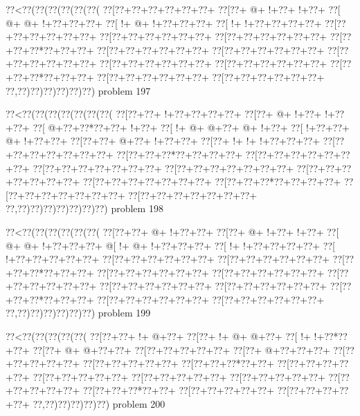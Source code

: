 \vbox{\vbox{\goo
\0??<\0??(\0??(\0??(\0??(\0??(\0??(
\0??[\0??+\0??+\0??+\0??+\0??+\0??+
\0??[\0??+\- @+\- !+\0??+\- !+\0??+
\0??[\- @+\- @+\- !+\0??+\0??+\0??+
\0??[\- !+\- @+\- !+\0??+\0??+\0??+
\0??[\- !+\- !+\0??+\0??+\0??+\0??+
\0??[\0??+\0??+\0??+\0??+\0??+\0??+
\0??[\0??+\0??+\0??+\0??+\0??+\0??+
\0??[\0??+\0??+\0??+\0??+\0??+\0??+
\0??[\0??+\0??+\0??*\0??+\0??+\0??+
\0??[\0??+\0??+\0??+\0??+\0??+\0??+
\0??[\0??+\0??+\0??+\0??+\0??+\0??+
\0??[\0??+\0??+\0??+\0??+\0??+\0??+
\0??[\0??+\0??+\0??+\0??+\0??+\0??+
\0??[\0??+\0??+\0??+\0??+\0??+\0??+
\0??[\0??+\0??+\0??*\0??+\0??+\0??+
\0??[\0??+\0??+\0??+\0??+\0??+\0??+
\0??[\0??+\0??+\0??+\0??+\0??+\0??+
\0??,\0??)\0??)\0??)\0??)\0??)\0??)
}
\hfil problem 197\hfil\break
}

\vbox{\vbox{\goo
\0??<\0??(\0??(\0??(\0??(\0??(\0??(\0??(
\0??[\0??+\0??+\- !+\0??+\0??+\0??+\0??+
\0??[\0??+\- @+\- !+\0??+\- !+\0??+\0??+
\0??[\- @+\0??+\0??*\0??+\0??+\- !+\0??+
\0??[\- !+\- @+\- @+\0??+\- @+\- !+\0??+
\0??[\- !+\0??+\0??+\- @+\- !+\0??+\0??+
\0??[\0??+\0??+\- @+\0??+\- !+\0??+\0??+
\0??[\0??+\- !+\- !+\- !+\0??+\0??+\0??+
\0??[\0??+\0??+\0??+\0??+\0??+\0??+\0??+
\0??[\0??+\0??+\0??*\0??+\0??+\0??+\0??+
\0??[\0??+\0??+\0??+\0??+\0??+\0??+\0??+
\0??[\0??+\0??+\0??+\0??+\0??+\0??+\0??+
\0??[\0??+\0??+\0??+\0??+\0??+\0??+\0??+
\0??[\0??+\0??+\0??+\0??+\0??+\0??+\0??+
\0??[\0??+\0??+\0??+\0??+\0??+\0??+\0??+
\0??[\0??+\0??+\0??*\0??+\0??+\0??+\0??+
\0??[\0??+\0??+\0??+\0??+\0??+\0??+\0??+
\0??[\0??+\0??+\0??+\0??+\0??+\0??+\0??+
\0??,\0??)\0??)\0??)\0??)\0??)\0??)\0??)
}
\hfil problem 198\hfil\break
}

\vbox{\vbox{\goo
\0??<\0??(\0??(\0??(\0??(\0??(\0??(
\0??[\0??+\0??+\- @+\- !+\0??+\0??+
\0??[\0??+\- @+\- !+\0??+\- !+\0??+
\0??[\- @+\- @+\- !+\0??+\0??+\0??+
\- @[\- !+\- @+\- !+\0??+\0??+\0??+
\0??[\- !+\- !+\0??+\0??+\0??+\0??+
\0??[\- !+\0??+\0??+\0??+\0??+\0??+
\0??[\0??+\0??+\0??+\0??+\0??+\0??+
\0??[\0??+\0??+\0??+\0??+\0??+\0??+
\0??[\0??+\0??+\0??*\0??+\0??+\0??+
\0??[\0??+\0??+\0??+\0??+\0??+\0??+
\0??[\0??+\0??+\0??+\0??+\0??+\0??+
\0??[\0??+\0??+\0??+\0??+\0??+\0??+
\0??[\0??+\0??+\0??+\0??+\0??+\0??+
\0??[\0??+\0??+\0??+\0??+\0??+\0??+
\0??[\0??+\0??+\0??*\0??+\0??+\0??+
\0??[\0??+\0??+\0??+\0??+\0??+\0??+
\0??[\0??+\0??+\0??+\0??+\0??+\0??+
\0??,\0??)\0??)\0??)\0??)\0??)\0??)
}
\hfil problem 199\hfil\break
}

\vbox{\vbox{\goo
\0??<\0??(\0??(\0??(\0??(\0??(
\0??[\0??+\0??+\- !+\- @+\0??+
\0??[\0??+\- !+\- @+\- @+\0??+
\0??[\- !+\- !+\0??*\0??+\0??+
\0??[\0??+\- @+\- @+\0??+\0??+
\0??[\0??+\0??+\0??+\0??+\0??+
\0??[\0??+\- @+\0??+\0??+\0??+
\0??[\0??+\0??+\0??+\0??+\0??+
\0??[\0??+\0??+\0??+\0??+\0??+
\0??[\0??+\0??+\0??*\0??+\0??+
\0??[\0??+\0??+\0??+\0??+\0??+
\0??[\0??+\0??+\0??+\0??+\0??+
\0??[\0??+\0??+\0??+\0??+\0??+
\0??[\0??+\0??+\0??+\0??+\0??+
\0??[\0??+\0??+\0??+\0??+\0??+
\0??[\0??+\0??+\0??*\0??+\0??+
\0??[\0??+\0??+\0??+\0??+\0??+
\0??[\0??+\0??+\0??+\0??+\0??+
\0??,\0??)\0??)\0??)\0??)\0??)
}
\hfil problem 200\hfil\break
}

